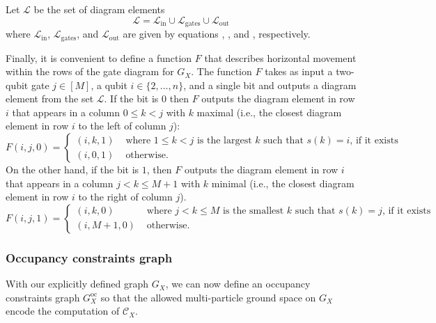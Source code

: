 \documentclass[../thesis-main/thesis-main]{subfiles}
\begin{document}
\begin{definition}
\label{defn:scriptL}Let $\mathcal{L}$ be the set of diagram
elements
\begin{equation}
\mathcal{L}=\mathcal{L}_{\text{in}}\cup\mathcal{L}_{\mathrm{gates}}\cup\mathcal{L}_{\text{out}}
\end{equation}
where $\mathcal{L}_{\text{in}}$, $\mathcal{L}_{\mathrm{gates}}$, and $\mathcal{L}_{\text{out}}$ are given by equations , , and , respectively.
\end{definition}

Finally, it is convenient to define a function $F$ that describes horizontal movement within the rows of the gate diagram for $G_X$. The function $F$ takes as input a two-qubit gate $j\in[M]$, a qubit $i\in\{2,\ldots,n\}$, and a single bit and outputs a diagram element from the set $\mathcal{L}$. If the bit is $0$ then $F$ outputs the diagram element in row $i$ that appears in a column $0\leq k<j$ with $k$ maximal (i.e., the closest diagram element in row $i$ to the left of column $j$):
\begin{equation}
F(i,j,0)=\begin{cases}
(i,k,1) & \text{ where }1\leq k<j\text{ is the largest }k\text{ such that }s(k)=i\text{, if it exists}\\
(i,0,1) & \text{ otherwise.}
\end{cases}\label{eq:F_bit0}
\end{equation}
On the other hand, if the bit is $1$, then $F$ outputs the diagram element in row $i$ that appears in a column $j<k\leq M+1$ with $k$ minimal (i.e., the closest diagram element in row $i$ to the right of column $j$). 
\begin{equation}
F(i,j,1)=\begin{cases}
(i,k,0) & \text{ where }j<k\leq M\text{ is the smallest }k\text{ such that }s(k)=j\text{, if it exists}\\
(i,M+1,0) & \text{ otherwise}.
\end{cases}\label{eq:F_bit1}
\end{equation}

\subsubsection{Occupancy constraints graph}\label{sec:occupancy_graph_defn}


With our explicitly defined graph $G_{X}$, we can now define an occupancy constraints graph $G_X^\text{oc}$ so that the allowed multi-particle ground space on $G_X$ encode the computation of $\mathcal{C}_X$. 
\end{document}
